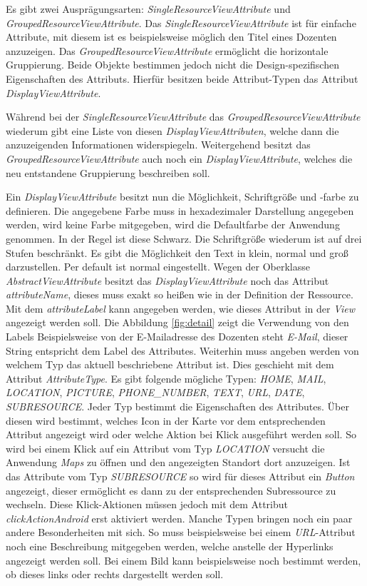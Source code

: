 Es gibt zwei Ausprägungsarten: \textit{SingleResourceViewAttribute} und \textit{GroupedResourceViewAttribute}.  Das \textit{SingleResourceViewAttribute} ist für einfache Attribute, mit diesem ist es beispielsweise möglich den Titel eines Dozenten anzuzeigen. Das \textit{GroupedResourceViewAttribute} ermöglicht die horizontale Gruppierung. Beide Objekte bestimmen jedoch nicht die Design-spezifischen Eigenschaften des Attributs. Hierfür besitzen beide Attribut-Typen das Attribut \textit{DisplayViewAttribute}.

Während bei der \textit{SingleResourceViewAttribute} das \textit{GroupedResourceViewAttribute} wiederum gibt eine Liste von diesen \textit{DisplayViewAttributen}, welche dann die anzuzeigenden Informationen widerspiegeln. Weitergehend besitzt das \textit{GroupedResourceViewAttribute} auch noch ein \textit{DisplayViewAttribute}, welches die neu entstandene Gruppierung beschreiben soll.

\newpage

Ein \textit{DisplayViewAttribute} besitzt nun die Möglichkeit, Schriftgröße und -farbe zu definieren. Die angegebene Farbe muss in hexadezimaler Darstellung angegeben werden, wird keine Farbe mitgegeben, wird die Defaultfarbe der Anwendung genommen. In der Regel ist diese Schwarz.  Die Schriftgröße wiederum ist auf drei Stufen beschränkt. Es gibt die Möglichkeit den Text in klein, normal und groß darzustellen. Per default ist normal eingestellt. Wegen der Oberklasse \textit{AbstractViewAttribute} besitzt das \textit{DisplayViewAttribute} noch das Attribut \textit{attributeName}, dieses muss exakt so heißen wie in der Definition der Ressource.
Mit dem \textit{attributeLabel} kann angegeben werden, wie dieses Attribut in der \textit{View} angezeigt werden soll. Die Abbildung \ref{fig:detail} zeigt die Verwendung von den Labels Beispielsweise von der E-Mailadresse des Dozenten steht \textit{E-Mail}, dieser String entspricht dem Label des Attributes. Weiterhin muss angeben werden von welchem Typ das aktuell beschriebene Attribut ist.
Dies geschieht mit dem Attribut \textit{AttributeType}. Es gibt folgende mögliche Typen: \textit{HOME}, \textit{MAIL}, \textit{LOCATION}, \textit{PICTURE}, \textit{PHONE\_NUMBER}, \textit{TEXT}, \textit{URL}, \textit{DATE}, \textit{SUBRESOURCE}. Jeder Typ bestimmt die Eigenschaften des Attributes. Über diesen wird bestimmt, welches Icon in der Karte vor dem entsprechenden Attribut angezeigt wird oder welche Aktion bei Klick ausgeführt werden soll. So wird bei einem Klick auf ein Attribut vom Typ \textit{LOCATION} versucht die Anwendung \textit{Maps} zu öffnen und den angezeigten Standort dort anzuzeigen. Ist das Attribute vom Typ \textit{SUBRESOURCE} so wird für dieses Attribut ein \textit{Button} angezeigt, dieser ermöglicht es dann zu der entsprechenden Subressource zu wechseln. Diese Klick-Aktionen müssen jedoch mit dem Attribut \textit{clickActionAndroid} erst aktiviert werden.
Manche Typen bringen noch ein paar andere Besonderheiten mit sich. So muss beispielsweise bei einem \textit{URL}-Attribut noch eine Beschreibung mitgegeben werden, welche anstelle der Hyperlinks angezeigt werden soll. Bei einem Bild kann beispielsweise noch bestimmt werden, ob dieses links oder rechts dargestellt werden soll. 

